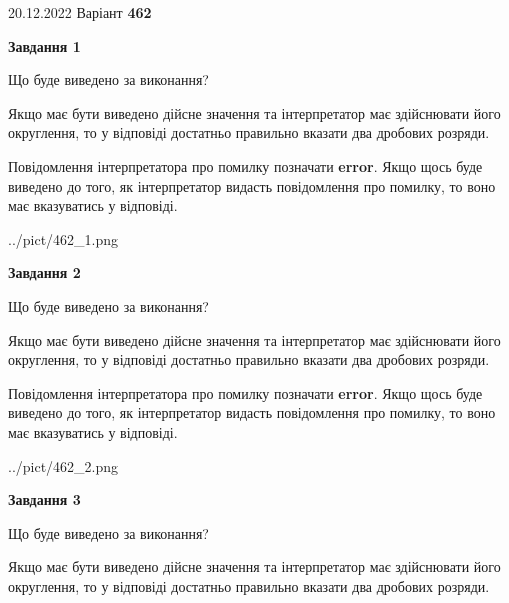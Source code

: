 \documentclass[12pt, ukrainian]{article}
\begin{document}
{20.12.2022 Варіант \No \textbf { 462 }\par}
{
\begin {Large}

{\begin {center}\textbf{Завдання 1}\end {center}}\par
Що буде виведено за виконання? \par

Якщо має бути виведено дійсне значення та інтерпретатор має здійснювати його округлення, 
то у відповіді достатньо правильно вказати два дробових розряди.

Повідомлення інтерпретатора про помилку позначати \textbf{error}.
Якщо щось буде виведено до того, як інтерпретатор видасть повідомлення про помилку, 
то воно має вказуватись у відповіді. \par

\begin{center}
	{../pict/462_1.png}
\end{center}
\newpage

{\begin {center}\textbf{Завдання 2}\end {center}}\par
Що буде виведено за виконання? \par

Якщо має бути виведено дійсне значення та інтерпретатор має здійснювати його округлення, 
то у відповіді достатньо правильно вказати два дробових розряди.

Повідомлення інтерпретатора про помилку позначати \textbf{error}.
Якщо щось буде виведено до того, як інтерпретатор видасть повідомлення про помилку, 
то воно має вказуватись у відповіді. \par

\begin{center}
	{../pict/462_2.png}
\end{center}
\newpage

{\begin {center}\textbf{Завдання 3}\end {center}}\par
Що буде виведено за виконання? \par

Якщо має бути виведено дійсне значення та інтерпретатор має здійснювати його округлення, 
то у відповіді достатньо правильно вказати два дробових розряди.


\end{Large}}
\end{document}
